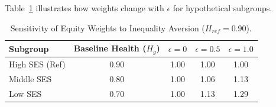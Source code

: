 \documentclass{article}
\begin{document}
Table~\ref{tab:weights} illustrates how weights change with $\epsilon$ for hypothetical subgroups.

\begin{table}[ht]
\centering
\begin{tabular}{lcccc}
\toprule
Subgroup & Baseline Health ($H_g$) & $\epsilon=0$ & $\epsilon=0.5$ & $\epsilon=1.0$ \\
\midrule
High SES (Ref) & 0.90 & 1.00 & 1.00 & 1.00 \\
Middle SES & 0.80 & 1.00 & 1.06 & 1.13 \\
Low SES & 0.70 & 1.00 & 1.13 & 1.29 \\
\bottomrule
\end{tabular}
\caption{Sensitivity of Equity Weights to Inequality Aversion ($H_{ref}=0.90$).}
\label{tab:weights}
\end{table}
\end{document}
